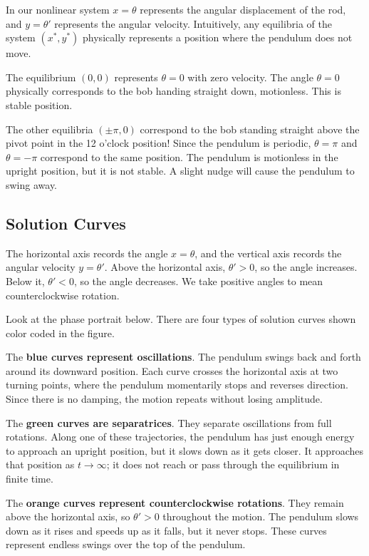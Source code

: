 \documentclass[11pt,letterpaper]{article}
\begin{document}
In our nonlinear system $x=\theta$ represents the angular displacement of the rod, and $y=\theta'$ represents the angular velocity. Intuitively, any equilibria of the system $(x^*,y^*)$ physically represents a position where the pendulum does not move. 

The equilibrium $(0,0)$ represents $\theta=0$ with zero velocity. The angle $\theta=0$ physically corresponds to the bob handing straight down, motionless. This is stable position. 

The other equilibria $(\pm \pi,0)$ correspond to the bob standing straight above the pivot point in the 12 o'clock position! Since the pendulum is periodic, $\theta=\pi$ and $\theta=-\pi$ correspond to the same position. The pendulum is motionless in the upright position, but it is not stable. A slight nudge will cause the pendulum to swing away. 

\subsection{Solution Curves}

The horizontal axis records the angle $x=\theta$, and the
vertical axis records the angular velocity $y=\theta'$.
Above the horizontal axis, $\theta'>0$, so the angle increases.
Below it, $\theta'<0$, so the angle decreases. We take positive angles to mean counterclockwise rotation. 

Look at the phase portrait below. There are four types of solution curves shown color coded in the figure.

The \textbf{blue curves represent oscillations}.
The pendulum swings back and forth around its downward
position. Each curve crosses the horizontal axis at two
turning points, where the pendulum momentarily stops and
reverses direction. Since there is no damping, the motion
repeats without losing amplitude.

The \textbf{green curves are separatrices}.
They separate oscillations from full rotations.
Along one of these trajectories, the pendulum has just
enough energy to approach an upright position, but it
slows down as it gets closer. It approaches that position
as $t\to\infty$; it does not reach or pass through the
equilibrium in finite time.

The \textbf{orange curves represent counterclockwise rotations}.
They remain above the horizontal axis, so $\theta'>0$
throughout the motion. The pendulum slows down as it
rises and speeds up as it falls, but it never stops.
These curves represent endless swings over the top of the pendulum.
\end{document}
